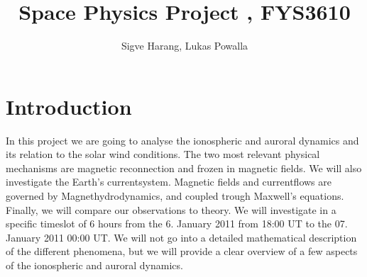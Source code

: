 \documentclass[10pt,a4paper]{article}
\author{Sigve Harang, Lukas Powalla}
\title{Space Physics Project , FYS3610}
\begin{document}
\maketitle
\newpage
\tableofcontents
\newpage
\section*{Introduction}
In this project we are going to analyse the ionospheric and auroral dynamics and its relation to the solar wind conditions. 
The two most relevant physical mechanisms are magnetic reconnection and frozen in magnetic fields. We will also investigate the Earth's currentsystem. Magnetic fields and 
currentflows are governed by Magnethydrodynamics, and coupled trough Maxwell's equations. Finally, we will compare our observations to theory. 
We will investigate in a specific timeslot of 6 hours from the 6. January 2011 from 18:00 UT to the 07. January 2011 00:00 UT. We will not go into a detailed mathematical
description of the different phenomena, but we will provide a clear overview of a few aspects of the ionospheric and auroral dynamics.
\end{document}
